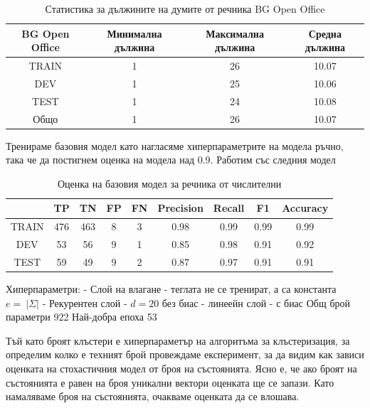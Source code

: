 \documentclass[a4paper,12pt]{article}
\begin{document}
\begin{table}[h!]
\centering
\begin{tabular}{|c|c|c|c|}
\hline
BG Open Office & Минимална дължина & Максимална дължина & Средна дължина\\
\hline
TRAIN & 1 & 26 & 10.07\\
\hline
DEV & 1 & 25 & 10.06\\
\hline
TEST & 1 & 24 & 10.08\\
\hline
Общо & 1 & 26 & 10.07\\
\hline
\end{tabular}
\caption{Статистика за дължините на думите от речника BG Open Office}
\label{table:4}
\end{table}

Тренираме базовия модел като нагласяме хиперпараметрите на модела ръчно, така че да постигнем оценка на модела над 0.9. Работим със следния модел

\begin{table}[h!]
\centering
\begin{tabular}{|c|c|c|c|c|c|c|c|c|}
\hline
 & TP & TN & FP & FN & Precision & Recall & F1 & Accuracy\\
\hline
TRAIN & 476 & 463 & 8 & 3 & 0.98 & 0.99 & 0.99 & 0.99\\
\hline
DEV & 53 & 56 & 9 & 1 & 0.85 & 0.98 & 0.91 & 0.92\\
\hline
TEST & 59 & 49 & 9 & 2 & 0.87 & 0.97 & 0.91 & 0.91\\
\hline
\end{tabular}
\caption{Оценка на базовия модел за речника от числителни}
\label{table:5}
\end{table}

Хиперпараметри:
- Слой на влагане - теглата не се тренират, а са константа $e =\:|\Sigma|$ 
- Рекурентен слой - $d = 20$ без биас
- линеейн слой - с биас 
Общ брой параметри  922
Най-добра епоха 53

Тъй като броят клъстери е хиперпараметър на алгоритъма за клъстеризация, за определим колко е техният брой провеждаме експеримент, за да видим как зависи оценката на стохастичния модел от броя на състоянията. Ясно е, че ако броят на състоянията е равен на броя уникални вектори оценката ще се запази. Като намаляваме броя на състоянията, очакваме оценката да се влошава. 
\end{document}

